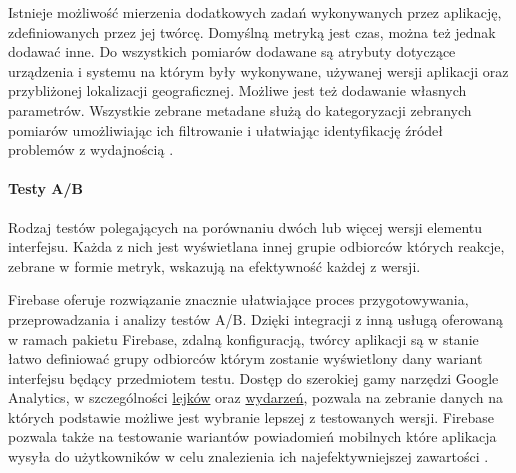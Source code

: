 Istnieje możliwość mierzenia dodatkowych zadań wykonywanych przez aplikację, zdefiniowanych przez jej twórcę. Domyślną metryką jest czas, można też jednak dodawać inne. Do wszystkich pomiarów dodawane są atrybuty dotyczące urządzenia i systemu na którym były wykonywane, używanej wersji aplikacji oraz przybliżonej lokalizacji geograficznej. Możliwe jest też dodawanie własnych parametrów. Wszystkie zebrane metadane służą do kategoryzacji zebranych pomiarów umożliwiając ich  filtrowanie i ułatwiając identyfikację źródeł problemów z wydajnością \cite{Fb_Pref_Monitor}.

\paragraph{Testy A/B}
Rodzaj testów polegających na porównaniu dwóch lub więcej wersji elementu interfejsu. Każda z nich jest wyświetlana innej grupie odbiorców których reakcje, zebrane w formie metryk, wskazują na efektywność każdej z wersji. 

Firebase oferuje rozwiązanie znacznie ułatwiające proces przygotowywania, przeprowadzania i analizy testów A/B. Dzięki integracji z inną usługą oferowaną w ramach pakietu Firebase, zdalną konfiguracją, twórcy aplikacji są w stanie łatwo definiować grupy odbiorców którym zostanie wyświetlony dany wariant interfejsu będący przedmiotem testu. Dostęp do szerokiej gamy narzędzi Google Analytics, w szczególności \hyperref[par:ga-funnels]{lejków} oraz  \hyperref[par:ga-events]{wydarzeń}, pozwala na zebranie danych na których podstawie możliwe jest wybranie lepszej z testowanych wersji. Firebase pozwala także na testowanie wariantów powiadomień mobilnych które aplikacja wysyła do użytkowników w celu znalezienia ich najefektywniejszej zawartości \cite{Fb_AB_Testing}.

